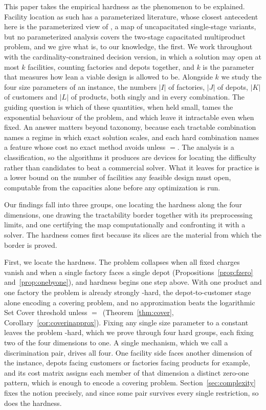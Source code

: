 This paper takes the empirical hardness as the phenomenon to be
explained. Facility location as such has a parameterized literature,
whose closest antecedent here is the parameterized view of
\citet{FellowsFernau2011}, a map of uncapacitated single-stage variants,
but no parameterized analysis covers the two-stage capacitated
multiproduct problem, and we give what is, to our knowledge, the first. We
work throughout with the cardinality-constrained decision version, in which
a solution may open at most $k$ facilities, counting factories and depots
together, and $k$ is
the parameter that measures how lean a viable design is allowed to be.
Alongside $k$ we study the four size parameters of an instance, the numbers
$|I|$ of factories, $|J|$ of depots, $|K|$ of customers and $|L|$ of
products, both singly and in every combination. The guiding question is
which of these quantities, when held small, tames the exponential behaviour
of the problem, and which leave it intractable even when fixed. An
answer matters beyond taxonomy, because each tractable combination names
a regime in which exact solution scales, and each hard combination names
a feature whose cost no exact method avoids unless \Ppoly${}={}$\NP. The
analysis is a classification, so the algorithms it produces are devices for
locating the difficulty rather than candidates to beat a commercial solver.
What it leaves for practice is a lower bound on the number of facilities
any feasible design must open, computable from the capacities alone
before any optimization is run.

Our findings fall into three groups, one locating the hardness along
the four dimensions, one drawing the tractability border together with
its preprocessing limits, and one certifying the map computationally and
confronting it with a solver. The hardness comes first because its
slices are the material from which the border is proved.

First, we locate the hardness. The problem collapses when all fixed
charges vanish and when a single factory faces a single depot
(Propositions~\ref{prop:fzero} and~\ref{prop:onebyone}), and hardness
begins one step above. With one product and one factory the problem is
already strongly \NP-hard, the depot-to-customer stage alone encoding a
covering problem, and no approximation beats the logarithmic Set Cover
threshold unless \Ppoly${}={}$\NP\ (Theorem~\ref{thm:cover},
Corollary~\ref{cor:coverinapprox}). Fixing any single size parameter to
a constant leaves the problem \NP-hard, which we prove through four
hard groups, each fixing two of the four dimensions to one. A single
mechanism, which we call a discrimination pair, drives all four. One
facility side faces another dimension of the instance, depots facing
customers or factories facing products for example, and its cost
matrix assigns each member of that dimension a distinct zero-one
pattern, which is enough to encode a covering problem.
Section~\ref{sec:complexity} fixes the notion precisely, and since
some pair survives every single restriction, so does the hardness.

